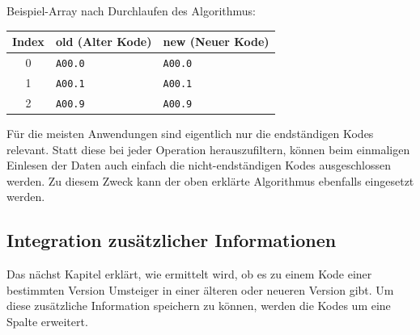 Beispiel-Array nach Durchlaufen des Algorithmus:

\begingroup
\renewcommand{\arraystretch}{1.2}
\setlength{\tabcolsep}{12pt}
\begin{tabular}{cll}
Index & old (Alter Kode) & new (Neuer Kode) \\
\hline
0 & \texttt{A00.0} & \texttt{A00.0} \\
1 & \texttt{A00.1} & \texttt{A00.1} \\
2 & \texttt{A00.9} & \texttt{A00.9} \\
\end{tabular}
\endgroup


Für die meisten Anwendungen sind eigentlich nur die endständigen Kodes relevant. Statt diese bei jeder Operation herauszufiltern, können beim einmaligen Einlesen der Daten auch einfach die nicht-endständigen Kodes ausgeschlossen werden. Zu diesem Zweck kann der oben erklärte Algorithmus ebenfalls eingesetzt werden. 

\subsection{Integration zusätzlicher Informationen}

Das nächst Kapitel erklärt, wie ermittelt wird, ob es zu einem Kode einer bestimmten Version Umsteiger in einer älteren oder neueren Version gibt. Um diese zusätzliche Information speichern zu können, werden die Kodes um eine Spalte erweitert.
